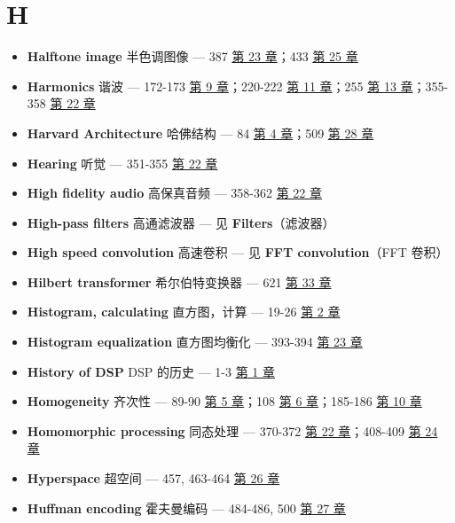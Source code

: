 \section{H}

\begin{itemize}
\tightlist
\item
  \textbf{Halftone image} 半色调图像 --- 387 
  \hyperref[ch-23]{第 23 章}；433  \hyperref[ch-25]{第 25 章}
\item
  \textbf{Harmonics} 谐波 --- 172-173  \hyperref[ch-09]{第 9
  章}；220-222  \hyperref[ch-11]{第 11 章}；255 
  \hyperref[ch-13]{第 13 章}；355-358  \hyperref[ch-22]{第 22
  章}
\item
  \textbf{Harvard Architecture} 哈佛结构 --- 84 
  \hyperref[ch-04]{第 4 章}；509  \hyperref[ch-28]{第 28 章}
\item
  \textbf{Hearing} 听觉 --- 351-355  \hyperref[ch-22]{第 22
  章}
\item
  \textbf{High fidelity audio} 高保真音频 --- 358-362 
  \hyperref[ch-22]{第 22 章}
\item
  \textbf{High-pass filters} 高通滤波器 --- 见
  \textbf{Filters}（滤波器）
\item
  \textbf{High speed convolution} 高速卷积 --- 见 \textbf{FFT
  convolution}（FFT 卷积）
\item
  \textbf{Hilbert transformer} 希尔伯特变换器 --- 621 
  \hyperref[ch-33]{第 33 章}
\item
  \textbf{Histogram, calculating} 直方图，计算 --- 19-26 
  \hyperref[ch-02]{第 2 章}
\item
  \textbf{Histogram equalization} 直方图均衡化 --- 393-394 
  \hyperref[ch-23]{第 23 章}
\item
  \textbf{History of DSP} DSP 的历史 --- 1-3 
  \hyperref[ch-01]{第 1 章}
\item
  \textbf{Homogeneity} 齐次性 --- 89-90  \hyperref[ch-05]{第 5
  章}；108  \hyperref[ch-06]{第 6 章}；185-186 
  \hyperref[ch-10]{第 10 章}
\item
  \textbf{Homomorphic processing} 同态处理 --- 370-372 
  \hyperref[ch-22]{第 22 章}；408-409  \hyperref[ch-24]{第 24
  章}
\item
  \textbf{Hyperspace} 超空间 --- 457, 463-464 
  \hyperref[ch-26]{第 26 章}
\item
  \textbf{Huffman encoding} 霍夫曼编码 --- 484-486, 500 
  \hyperref[ch-27]{第 27 章}
\end{itemize}

